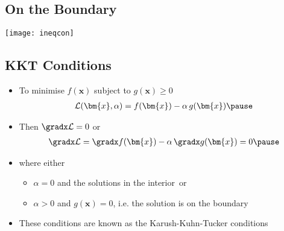 \begin{slide}
\section[-2]{On the Boundary}

\begin{center}
  \texttt{[image: ineqcon]}
\end{center}
\end{slide}


\begin{slide}
\section[-1]{KKT Conditions}

\begin{PauseHighLight}
  \begin{itemize}
  \item To minimise $f(\bm{x})$ subject to $g(\bm{x})\geq0$
    \begin{align*}
      \mathcal{L}(\bm{x},\alpha) =  f(\bm{x}) - \alpha\, g(\bm{x})\pause
    \end{align*}
  \item Then $\gradx \mathcal{L}=0$ or
    \begin{align*}
      \gradx \mathcal{L} = \gradx f(\bm{x}) - \alpha\,\gradx g(\bm{x}) =0\pause
    \end{align*}
  \item where either
    \begin{itemize}
    \item $\alpha = 0$ and the solutions in the interior\pause\ or
    \item $\alpha>0$ and $g(\bm{x})=0$, i.e. the solution is on the
      boundary\pause
    \end{itemize}
  \item These conditions are known as the Karush-Kuhn-Tucker
    conditions\pause
  \end{itemize}
\end{PauseHighLight}

\end{slide}


